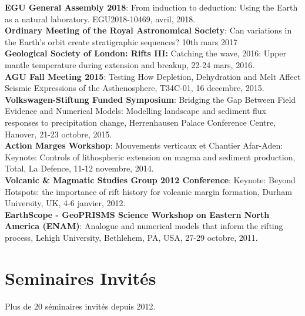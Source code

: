 \documentclass[hidelinks,10pt]{article} %
\begin{document}
{\bf EGU General Assembly 2018}: From induction to deduction: Using the Earth as a natural laboratory. EGU2018-10469, avril, 2018.\\
{\bf Ordinary Meeting of the Royal Astronomical Society}: Can variations in the Earth's orbit create stratigraphic sequences? 10th mars 2017\\
{\bf Geological Society of London: Rifts III:} Catching the wave, 2016: Upper mantle temperature during extension and breakup, 22-24 mars, 2016.\\
{\bf AGU Fall Meeting 2015}: Testing How Depletion, Dehydration and Melt Affect Seismic Expressions of the Asthenosphere, T34C-01, 16 decembre, 2015.\\
{\bf Volkswagen-Stiftung Funded Symposium}: Bridging the Gap Between Field Evidence and Numerical Models: Modelling landscape and sediment flux responses to precipitation change, Herrenhausen Palace Conference Centre, Hanover, 21-23 octobre, 2015.\\
{\bf Action Marges Workshop}: Mouvements verticaux et Chantier Afar-Aden: Keynote: Controls of lithospheric extension on magma and sediment production, Total, La Defence, 11-12 novembre, 2014.\\
{\bf Volcanic \& Magmatic Studies Group 2012 Conference}: Keynote: Beyond Hotspots: the importance of rift history for volcanic margin formation, Durham University, UK, 4-6 janvier, 2012.\\
{\bf EarthScope - GeoPRISMS Science Workshop on Eastern North America (ENAM)}: Analogue and numerical models that inform the rifting process, Lehigh University, Bethlehem, PA, USA, 27-29 octobre, 2011.\\

\section{Seminaires Invités}
Plus de 20 séminaires invités depuis 2012.
\end{document}

